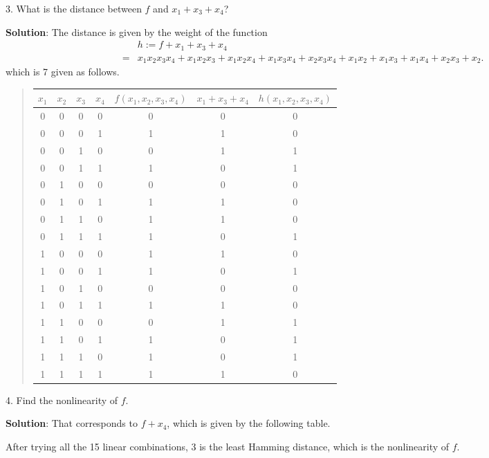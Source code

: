 \documentclass[12pt]{article}
\theoremstyle{plain}
\begin{document}
3. What is the distance between $f$ and $x_1 + x_3 + x_4$?

{\bf Solution}: The distance is given by the weight of the function
$$\begin{aligned}
&h := f + x_1 + x_3 + x_4 \\
=& x_1x_2x_3x_4 + x_1x_2x_3 + x_1x_2x_4 + x_1x_3x_4 + x_2x_3x_4 + x_1x_2 
+ x_1x_3 + x_1x_4 + x_2x_3 + x_2.
\end{aligned}$$
which is 7 given as follows.

\begin{quote}
\begin{tabular}{c c c c| c || c || c }
$x_1$ & $x_2$ & $x_3$ & $x_4$ & $f(x_1, x_2, x_3, x_4)$ & $x_1+x_3+x_4$ & $h(x_1, x_2, x_3, x_4)$ \\
\hline
0 & 0 & 0 & 0 & 0 & 0 &	0\\
0 & 0 & 0 & 1 & 1 & 1 &	0\\
0 & 0 & 1 & 0 & 0 & 1 & 1\\
0 & 0 & 1 & 1 & 1 & 0	&	1\\
0 & 1 & 0 & 0 & 0 & 0	&	0\\
0 & 1 & 0 & 1 & 1 & 1	&	0\\
0 & 1 & 1 & 0 & 1 & 1	& 0\\
0 & 1 & 1 & 1 & 1 & 0	&	1\\
1 & 0 & 0 & 0 & 1 & 1	&	0\\
1 & 0 & 0 & 1 & 1 & 0	&	1\\
1 & 0 & 1 & 0 & 0 & 0	&	0\\
1 & 0 & 1 & 1 & 1 & 1	&	0\\
1 & 1 & 0 & 0 & 0 & 1	&	1\\
1 & 1 & 0 & 1 & 1 & 0	&	1\\
1 & 1 & 1 & 0 & 1 & 0	&	1\\
1 & 1 & 1 & 1 & 1 & 1	&	0\\
\end{tabular}
\end{quote}

4. Find the nonlinearity of $f$.

{\bf Solution}: That corresponds to $f + x_4$, which is given by the following table. 

After trying all the 15 linear combinations, $3$ is the least Hamming distance, which is the nonlinearity of $f$.
\end{document}
